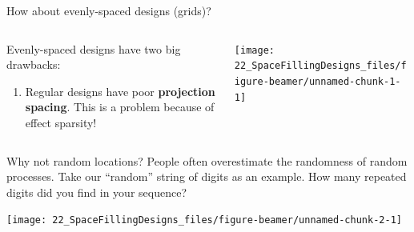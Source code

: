 \documentclass[
  9pt,
  ignorenonframetext,
]{beamer}
\begin{document}
\begin{frame}{How about evenly-spaced designs (grids)?}
\protect\hypertarget{how-about-evenly-spaced-designs-grids}{}
\begin{columns}
\begin{column}{0.6\textwidth}

Evenly-spaced designs have two big drawbacks:
\medskip
\begin{enumerate}
  \item<4-> Regular designs have poor \textbf{projection spacing}. This is a problem because of effect sparsity!
\end{enumerate}

\end{column}
\begin{column}{0.4\textwidth}

\begin{center}\texttt{[image: 22\_SpaceFillingDesigns\_files/figure-beamer/unnamed-chunk-1-1]} \end{center}
\end{column}
\end{columns}
\end{frame}

\begin{frame}{Why not random locations?}
\protect\hypertarget{why-not-random-locations}{}
People often overestimate the randomness of random processes. Take our
``random'' string of digits as an example. How many repeated digits did
you find in your sequence?

\pause

\begin{center}\texttt{[image: 22\_SpaceFillingDesigns\_files/figure-beamer/unnamed-chunk-2-1]} \end{center}
\end{frame}
\end{document}

